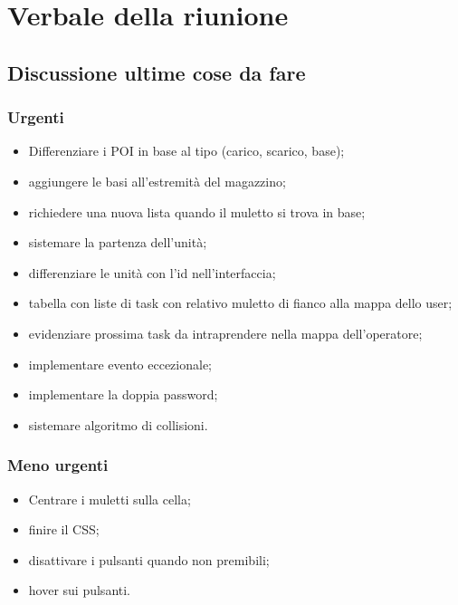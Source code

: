 \section{Verbale della riunione}

\subsection{Discussione ultime cose da fare}

\subsubsection{Urgenti}

\begin{itemize}
	\item Differenziare i POI in base al tipo (carico, scarico, base);
	\item aggiungere le basi all'estremità del magazzino;
	\item richiedere una nuova lista quando il muletto si trova in base;
	\item sistemare la partenza dell'unità;
	\item differenziare le unità con l'id nell'interfaccia;
	\item tabella con liste di task con relativo muletto di fianco alla mappa dello user;
	\item evidenziare prossima task da intraprendere nella mappa dell'operatore;
	\item implementare evento eccezionale;
	\item implementare la doppia password;
	\item sistemare algoritmo di collisioni.
	
\end{itemize}
\subsubsection{Meno urgenti}

\begin{itemize}
	\item Centrare i muletti sulla cella;
	\item finire il CSS;
	\item disattivare i pulsanti quando non premibili;
	\item hover sui pulsanti.
\end{itemize}
